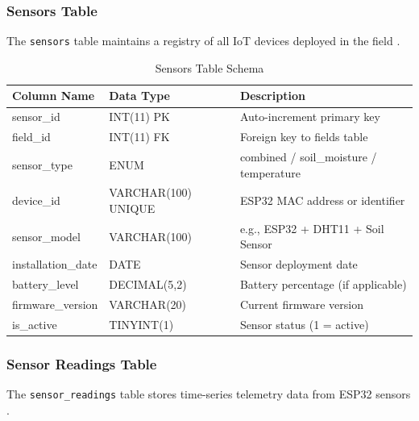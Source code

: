 \subsubsection{Sensors Table}
The \texttt{sensors} table maintains a registry of all IoT devices 
deployed in the field \cite{farooq2019survey}.

\begin{table}[H]
\centering
\small
\begin{tabular}{|l|l|p{6cm}|}
\hline
\textbf{Column Name} & \textbf{Data Type} & \textbf{Description} 
\\ \hline
sensor\_id & INT(11) PK & Auto-increment primary key \\ \hline
field\_id & INT(11) FK & Foreign key to fields table \\ \hline
sensor\_type & ENUM & combined / soil\_moisture / temperature \\ 
\hline
device\_id & VARCHAR(100) UNIQUE & ESP32 MAC address or identifier 
\\ \hline
sensor\_model & VARCHAR(100) & e.g., ESP32 + DHT11 + Soil Sensor 
\\ \hline
installation\_date & DATE & Sensor deployment date \\ \hline
battery\_level & DECIMAL(5,2) & Battery percentage (if applicable) 
\\ \hline
firmware\_version & VARCHAR(20) & Current firmware version \\ \hline
is\_active & TINYINT(1) & Sensor status (1 = active) \\ \hline
\end{tabular}
\caption{Sensors Table Schema}
\label{tab:sensors-schema}
\end{table}

\subsubsection{Sensor Readings Table}
The \texttt{sensor\_readings} table stores time-series telemetry 
data from ESP32 sensors \cite{ncbi2023iot}.

